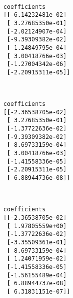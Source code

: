 \documentclass[11pt]{article}
\begin{document}
    \begin{center}
    \end{center}
    { \hspace*{\fill} \\}
    
    \begin{Verbatim}[commandchars=\\\{\}]
coefficients
[[-6.14232481e-02]
 [ 3.27685350e-01]
 [-2.02124907e-04]
 [-9.39309382e-02]
 [ 1.24849795e-04]
 [ 3.00418766e-03]
 [-1.27004342e-06]
 [-2.20915311e-05]]

    \end{Verbatim}

    \begin{center}
    \end{center}
    { \hspace*{\fill} \\}
    
    \begin{Verbatim}[commandchars=\\\{\}]
coefficients
[[-2.36538705e-02]
 [ 3.27685350e-01]
 [-1.37722636e-02]
 [-9.39309382e-02]
 [ 8.69733159e-04]
 [ 3.00418766e-03]
 [-1.41558336e-05]
 [-2.20915311e-05]
 [ 6.88944736e-08]]

    \end{Verbatim}

    \begin{center}
    \end{center}
    { \hspace*{\fill} \\}
    
    \begin{Verbatim}[commandchars=\\\{\}]
coefficients
[[-2.36538705e-02]
 [ 1.97805559e+00]
 [-1.37722636e-02]
 [-3.35509361e-01]
 [ 8.69733159e-04]
 [ 1.24071959e-02]
 [-1.41558336e-05]
 [-1.56155489e-04]
 [ 6.88944737e-08]
 [ 6.31831151e-07]]

    \end{Verbatim}

    \begin{center}
    \end{center}
    { \hspace*{\fill} \\}
    
\end{document}

